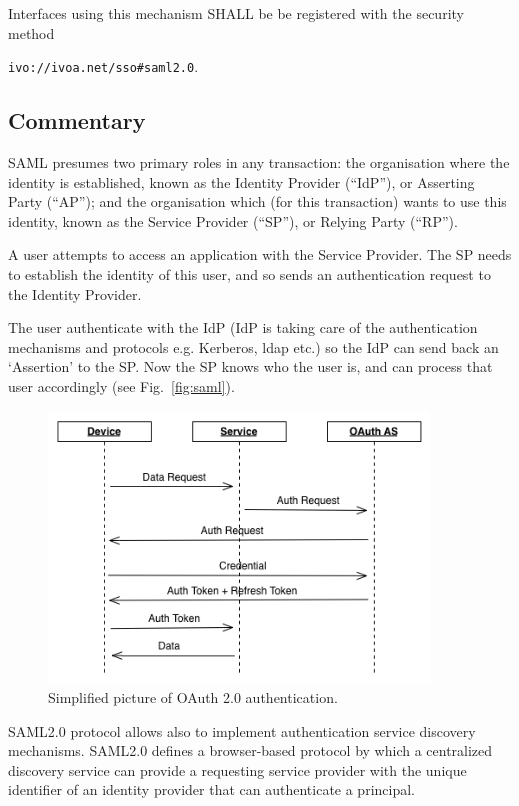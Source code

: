 \documentclass[11pt,a4paper]{ivoa}
\begin{document}
Interfaces using this mechanism SHALL be be registered with the security method 

\texttt{ivo://ivoa.net/sso\#saml2.0}.


\subsection{Commentary}
SAML presumes two primary roles in any transaction: the organisation where the identity is established, 
known as the Identity Provider (``IdP''), or Asserting Party (``AP''); 
and the organisation which (for this transaction) wants to use this identity, known as the Service Provider (``SP''), 
or Relying Party (``RP'').

A user attempts to access an application with the Service Provider. 
The SP needs to establish the identity of this user, and so sends an authentication request to the Identity Provider. 

The user authenticate with the IdP (IdP is taking care of the authentication mechanisms and protocols e.g. Kerberos, ldap etc.) so the IdP can send back an `Assertion' to the SP. 
Now the SP knows who the user is, and can process that user accordingly (see Fig.~\ref{fig:saml}).
\begin{figure}
\centering
\includegraphics[width=0.9\textwidth]{SSO_image003.png}
\caption{Simplified picture of OAuth 2.0 authentication.} 
\label{fig:oauth}
\end{figure}
 
SAML2.0 protocol allows also to implement authentication service discovery mechanisms. SAML2.0  defines a browser-based protocol 
by which a centralized discovery service can provide a requesting service provider with the unique identifier of an 
identity provider that can authenticate a principal.  
\end{document}
